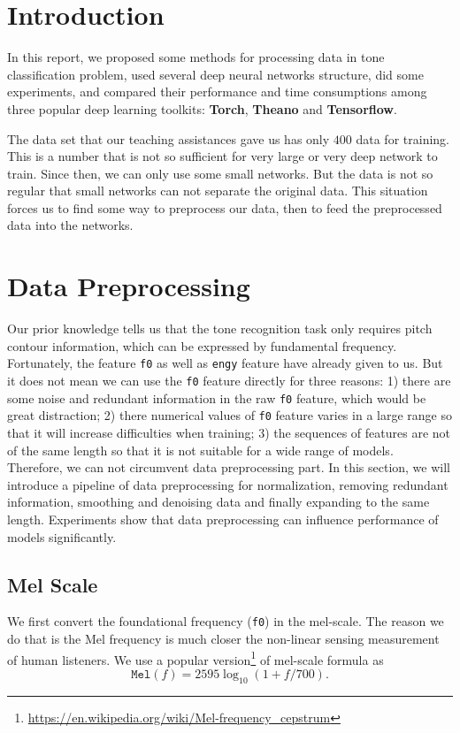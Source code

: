 \documentclass[a4paper]{article}
\begin{document}
\maketitle
\pagebreak

\section{Introduction}

In this report, we proposed some methods for processing data in tone classification problem, used several deep neural networks structure, did some experiments, and compared their performance and time consumptions among three popular deep learning toolkits: {\bf Torch}, {\bf Theano} and {\bf Tensorflow}.

The data set that our teaching assistances gave us has only $400$ data for training. This is a number that is not so sufficient for very large or very deep network to train. Since then, we can only use some small networks. But the data is not so regular that small networks can not separate the original data. This situation forces us to find some way to preprocess our data, then to feed the preprocessed data into the networks.

\section{Data Preprocessing}

Our prior knowledge tells us that the tone recognition task only requires pitch contour information, which can be expressed by fundamental frequency. Fortunately, the feature \texttt{f0} as well as \texttt{engy} feature have already given to us. But it does not mean we can use the \texttt{f0} feature directly for three reasons: 1) there are some noise and redundant information in the raw \texttt{f0} feature, which would be great distraction; 2) there numerical values of \texttt{f0} feature varies in a large range so that it will increase difficulties when training; 3) the sequences of features are not of the same length so that it is not suitable for a wide range of models. Therefore, we can not circumvent data preprocessing part. In this section, we will introduce a pipeline of data preprocessing for normalization, removing redundant information, smoothing and denoising data and finally expanding to the same length. Experiments show that data preprocessing can influence performance of models significantly.
\subsection{Mel Scale}
We first convert the foundational frequency (\texttt{f0}) in the mel-scale. The reason we do that is the Mel frequency is much closer the non-linear sensing measurement of human listeners. We use a popular version\footnote{\url{https://en.wikipedia.org/wiki/Mel-frequency_cepstrum}} of mel-scale formula as
	\[\mathtt{Mel}(f) = 2595\log_{10}(1+f/ 700).\]
	
\end{document}
